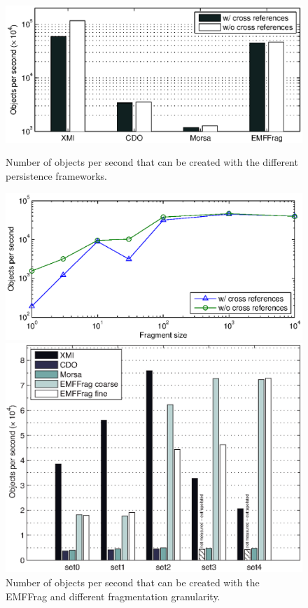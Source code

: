 \begin{figure}[t]
\begin{minipage}[b]{0.48\linewidth}
\centering
\includegraphics[width=\linewidth]{figures/createObjectsPerSecond}
\vspace{-0.26cm}
\label{fig:createObjectsPerSecond}
\caption{Number of objects per second that can be created with the different persistence frameworks.}
\end{minipage}
\hspace{0.02\linewidth}
\begin{minipage}[b]{0.48\linewidth}
\centering
\includegraphics[width=\linewidth]{figures/createObjectsFragPerSecond}
\caption{Number of objects per second that can be created with the EMFFrag and different fragmentation granularity.}
\label{fig:createObjectsFragPerSecond}
\end{minipage}
\begin{minipage}[b]{0.48\linewidth}
\centering
\includegraphics[width=\linewidth]{figures/grabatsTraverseObjectsPerSecondExtra}

\end{minipage}
\end{figure}
